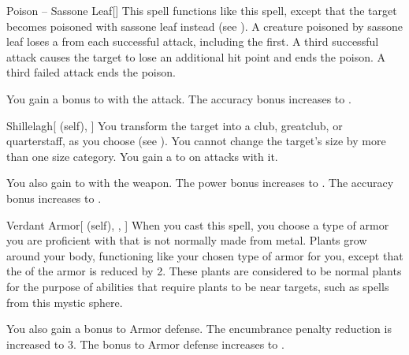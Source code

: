 \lowercase{\hypertarget{spell:Poison -- Sassone Leaf}{}}\label{spell:Poison -- Sassone Leaf}
\begin{freeability}[Rank 1]{\hypertarget{spell:Poison -- Sassone Leaf}{Poison -- Sassone Leaf}}[]
This spell functions like this  spell, except that the target becomes poisoned with sassone leaf instead (see ).
A creature poisoned by sassone leaf loses a  from each successful attack, including the first.
A third successful attack causes the target to lose an additional hit point and ends the poison.
A third failed attack ends the poison.

\rankline
{} You gain a  bonus to  with the attack.
 The accuracy bonus increases to .
\end{freeability}
\vspace{0.25em}



\lowercase{\hypertarget{spell:Shillelagh}{}}\label{spell:Shillelagh}
\begin{attuneability}[Rank 1]{\hypertarget{spell:Shillelagh}{Shillelagh}}[ (self), ]
You transform the target into a club, greatclub, or quarterstaff, as you choose (see ).
You cannot change the target's size by more than one size category.
You gain a   to  on attacks with it.

\rankline
{} You also gain   to  with the weapon.
 The power bonus increases to .
 The accuracy bonus increases to .
\end{attuneability}
\vspace{0.25em}



\lowercase{\hypertarget{spell:Verdant Armor}{}}\label{spell:Verdant Armor}
\begin{attuneability}[Rank 1]{\hypertarget{spell:Verdant Armor}{Verdant Armor}}[ (self), , ]
When you cast this spell, you choose a type of armor you are proficient with that is not normally made from metal.
Plants grow around your body, functioning like your chosen type of armor for you, except that the  of the armor is reduced by 2.
These plants are considered to be normal plants for the purpose of abilities that require plants to be near targets, such as spells from this mystic sphere.

\rankline
{} You also gain a  bonus to Armor defense.
 The encumbrance penalty reduction is increased to 3.
 The bonus to Armor defense increases to .
\end{attuneability}
\vspace{0.25em}



